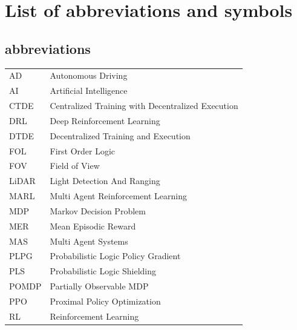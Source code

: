 \documentclass[master=mai,openany]{kulemt}
\begin{document}
\begin{abstract}
Across all evaluated multi-agent configurations, conservative decentralized PLS improves TSR and reduces failures relative to unshielded PPO. However, as the number of interacting cars grows, some avoided failures become timeouts, revealing a trade-off between local caution and collective progress. A mixed two-car shield assignment achieves the strongest two-agent result, indicating that breaking behavioural symmetry can improve coordination. In selected deadlock cases, centralized shielding resolves mutual waiting by coordinating an ordered intersection passage. Shared-policy training also outperforms separate-policy training in the three-car setting. These findings show that PLS is a useful mechanism for multi-agent urban navigation, but that its value must be judged by its effect on collective safety, scene-level completion, and coordination rather than on individual failure reduction alone.
\end{abstract}

\listoffiguresandtables
\chapter{List of abbreviations and symbols}
\section*{abbreviations}
\begin{flushleft}
  \renewcommand{\arraystretch}{1.1}
  \begin{tabularx}{\textwidth}{@{}p{12mm}X@{}}
    AD   & Autonomous Driving \\
    AI   & Artificial Intelligence \\
    CTDE   & Centralized Training with Decentralized Execution \\
    DRL   & Deep Reinforcement Learning \\
    DTDE   & Decentralized Training and Execution \\
    FOL   & First Order Logic \\
    FOV   & Field of View \\
    LiDAR   & Light Detection And Ranging \\
    MARL   & Multi Agent Reinforcement Learning \\
    MDP   & Markov Decision Problem \\
    MER   & Mean Episodic Reward \\
    MAS   & Multi Agent Systems \\
    PLPG   &  Probabilistic Logic Policy Gradient \\
    PLS   & Probabilistic Logic Shielding \\
    POMDP   & Partially Observable MDP \\
    PPO  & Proximal Policy Optimization \\
    RL   & Reinforcement Learning \\
  \end{tabularx}
\end{flushleft}
\end{document}
